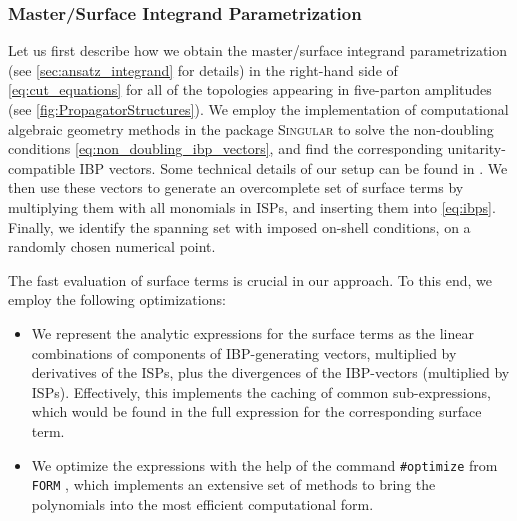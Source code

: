 \subsubsection{Master/Surface Integrand Parametrization}

Let us first describe how we obtain the master/surface integrand parametrization (see \cref{sec:ansatz_integrand} for details)
in the right-hand  side of \cref{eq:cut_equations} for all of the topologies appearing in five-parton amplitudes (see \cref{fig:PropagatorStructures}).
We employ the implementation of computational algebraic geometry methods in the package \textsc{Singular} \cite{DGPS}
to solve the non-doubling conditions \eqref{eq:non_doubling_ibp_vectors},
and find the corresponding unitarity-compatible IBP vectors.
Some technical details of our setup can be found in \cite{Abreu:2017hqn}.
We then use these vectors to generate an overcomplete set of surface terms by multiplying
them with all monomials in ISPs, and inserting them into \cref{eq:ibps}.
Finally, we identify the spanning set with imposed on-shell conditions, on a randomly chosen numerical 
point.


The fast evaluation of surface terms is crucial in our approach.
To this end, we employ the following optimizations:
\begin{itemize}
  \item We represent the analytic expressions for the surface terms
    as the linear combinations of components of IBP-generating vectors, multiplied by derivatives of the ISPs,
    plus the divergences of the IBP-vectors (multiplied by ISPs). 
    Effectively, this implements the caching of common sub-expressions, which would be found in the full expression for the corresponding surface term.
  \item We optimize the expressions with the help of the command \texttt{\#optimize} from \texttt{FORM} \cite{Vermaseren:2000nd},
    which implements an extensive set of methods to bring the polynomials into the most efficient computational form.
\end{itemize}

